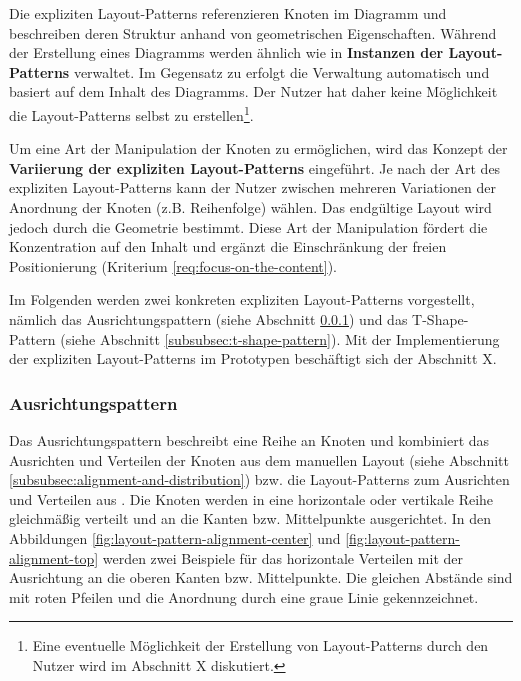 Die expliziten Layout-Patterns referenzieren Knoten im Diagramm und beschreiben deren Struktur anhand von geometrischen Eigenschaften. Während der Erstellung eines Diagramms werden ähnlich wie in \cite{Maier12A-Pattern-based} \textbf{Instanzen der Layout-Patterns} verwaltet. Im Gegensatz zu \cite{Maier12A-Pattern-based} erfolgt die Verwaltung automatisch und basiert auf dem Inhalt des Diagramms. Der Nutzer hat daher keine Möglichkeit die Layout-Patterns selbst zu erstellen\footnote{Eine eventuelle Möglichkeit der Erstellung von Layout-Patterns durch den Nutzer wird im Abschnitt X diskutiert.}.

Um eine Art der Manipulation der Knoten zu ermöglichen, wird das Konzept der \textbf{Variierung der expliziten Layout-Patterns} eingeführt. Je nach der Art des expliziten Layout-Patterns kann der Nutzer zwischen mehreren Variationen der Anordnung der Knoten (z.B. Reihenfolge) wählen. Das endgültige Layout wird jedoch durch die Geometrie bestimmt. Diese Art der Manipulation fördert die Konzentration auf den Inhalt und ergänzt die Einschränkung der freien Positionierung (Kriterium \ref{req:focus-on-the-content}).

Im Folgenden werden zwei konkreten expliziten Layout-Patterns vorgestellt, nämlich das Ausrichtungspattern (siehe Abschnitt \ref{subsubsec:alignment-pattern}) und das T-Shape-Pattern (siehe Abschnitt \ref{subsubsec:t-shape-pattern}). Mit der Implementierung der expliziten Layout-Patterns im Prototypen beschäftigt sich der Abschnitt X.

\subsubsection{Ausrichtungspattern}
\label{subsubsec:alignment-pattern}

Das Ausrichtungspattern beschreibt eine Reihe an Knoten und kombiniert das Ausrichten und Verteilen der Knoten aus dem manuellen Layout (siehe Abschnitt \ref{subsubsec:alignment-and-distribution}) bzw. die Layout-Patterns zum Ausrichten und Verteilen aus \cite[S.143ff und S.136ff]{Maier12A-Pattern-based}. Die Knoten werden in eine horizontale oder vertikale Reihe gleichmäßig verteilt und an die Kanten bzw. Mittelpunkte ausgerichtet. In den Abbildungen \ref{fig:layout-pattern-alignment-center} und \ref{fig:layout-pattern-alignment-top} werden zwei Beispiele für das horizontale Verteilen mit der Ausrichtung an die oberen Kanten bzw. Mittelpunkte. Die gleichen Abstände sind mit roten Pfeilen und die Anordnung durch eine graue Linie gekennzeichnet.

